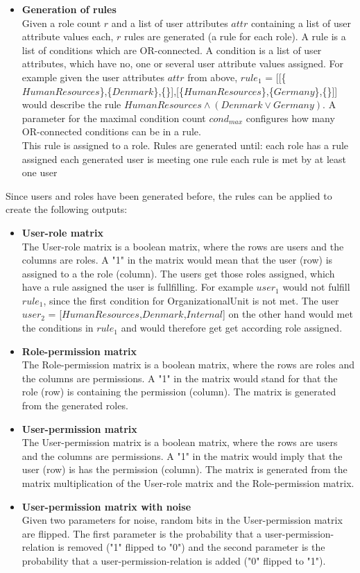 \begin{itemize}
		\item \textbf{Generation of rules}\\
		Given a role count $r$ and a list of user attributes $attr$ containing a list of user attribute values each, $r$ rules are generated (a rule for each role). A rule is a list of conditions which are OR-connected. A condition is a list of user attributes, which have no, one or several user attribute values assigned. For example given the user attributes $attr$ from above, $rule_1$ = [[\{$HumanResources$\},\{$Denmark$\},\{\}],[\{$HumanResources$\},\{$Germany$\},\{\}]] would describe the rule $HumanResources \wedge (Denmark \vee Germany)$. A parameter for the maximal condition count $cond_{max}$ configures how many OR-connected conditions can be in a rule.\\
		This rule is assigned to a role. Rules are generated until:
		\subitem \textbullet \space each role has a rule assigned
		\subitem \textbullet \space each generated user is meeting one rule
		\subitem \textbullet \space each rule is met by at least one user
	\end{itemize}
	Since users and roles have been generated before, the rules can be applied to create the following outputs:
	\begin{itemize}
		\item \textbf{User-role matrix}\\
		The User-role matrix is a boolean matrix, where the rows are users and the columns are roles. A "1" in the matrix would mean that the user (row) is assigned to a the role (column). The users get those roles assigned, which have a rule assigned the user is fullfilling. For example $user_1$ would not fulfill $rule_1$, since the first condition for OrganizationalUnit is not met. The user $user_2$ = [$HumanResources$,$Denmark$,$Internal$] on the other hand would met the conditions in $rule_1$ and would therefore get get according role assigned.
		\item \textbf{Role-permission matrix}\\
		The Role-permission matrix is a boolean matrix, where the rows are roles and the columns are permissions. A "1" in the matrix would stand for that the role (row) is containing the permission (column). The matrix is generated from the generated roles.
		\item \textbf{User-permission matrix}\\
		The User-permission matrix is a boolean matrix, where the rows are users and the columns are permissions. A "1" in the matrix would imply that the user (row) is has the permission (column). The matrix is generated from the matrix multiplication of the User-role matrix and the Role-permission matrix.
		\item \textbf{User-permission matrix with noise}\\
		Given two parameters for noise, random bits in the User-permission matrix are flipped. The first parameter is the probability that a user-permission-relation is removed ("1" flipped to "0") and the second parameter is the probability that a user-permission-relation is added ("0" flipped to "1").
	\end{itemize}